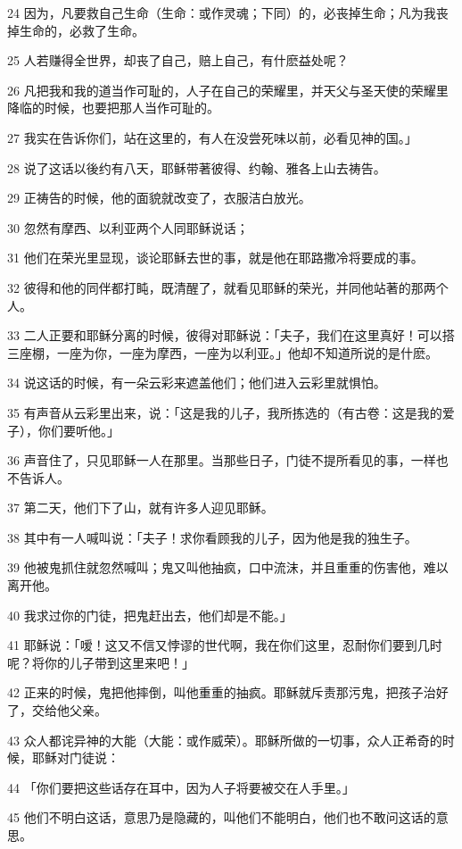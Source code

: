 \par 24 因为，凡要救自己生命（生命：或作灵魂；下同）的，必丧掉生命；凡为我丧掉生命的，必救了生命。
\par 25 人若赚得全世界，却丧了自己，赔上自己，有什麽益处呢？
\par 26 凡把我和我的道当作可耻的，人子在自己的荣耀里，并天父与圣天使的荣耀里降临的时候，也要把那人当作可耻的。
\par 27 我实在告诉你们，站在这里的，有人在没尝死味以前，必看见神的国。」
\par 28 说了这话以後约有八天，耶稣带著彼得、约翰、雅各上山去祷告。
\par 29 正祷告的时候，他的面貌就改变了，衣服洁白放光。
\par 30 忽然有摩西、以利亚两个人同耶稣说话；
\par 31 他们在荣光里显现，谈论耶稣去世的事，就是他在耶路撒冷将要成的事。
\par 32 彼得和他的同伴都打盹，既清醒了，就看见耶稣的荣光，并同他站著的那两个人。
\par 33 二人正要和耶稣分离的时候，彼得对耶稣说：「夫子，我们在这里真好！可以搭三座棚，一座为你，一座为摩西，一座为以利亚。」他却不知道所说的是什麽。
\par 34 说这话的时候，有一朵云彩来遮盖他们；他们进入云彩里就惧怕。
\par 35 有声音从云彩里出来，说：「这是我的儿子，我所拣选的（有古卷：这是我的爱子），你们要听他。」
\par 36 声音住了，只见耶稣一人在那里。当那些日子，门徒不提所看见的事，一样也不告诉人。
\par 37 第二天，他们下了山，就有许多人迎见耶稣。
\par 38 其中有一人喊叫说：「夫子！求你看顾我的儿子，因为他是我的独生子。
\par 39 他被鬼抓住就忽然喊叫；鬼又叫他抽疯，口中流沫，并且重重的伤害他，难以离开他。
\par 40 我求过你的门徒，把鬼赶出去，他们却是不能。」
\par 41 耶稣说：「嗳！这又不信又悖谬的世代啊，我在你们这里，忍耐你们要到几时呢？将你的儿子带到这里来吧！」
\par 42 正来的时候，鬼把他摔倒，叫他重重的抽疯。耶稣就斥责那污鬼，把孩子治好了，交给他父亲。
\par 43 众人都诧异神的大能（大能：或作威荣）。耶稣所做的一切事，众人正希奇的时候，耶稣对门徒说：
\par 44 「你们要把这些话存在耳中，因为人子将要被交在人手里。」
\par 45 他们不明白这话，意思乃是隐藏的，叫他们不能明白，他们也不敢问这话的意思。
